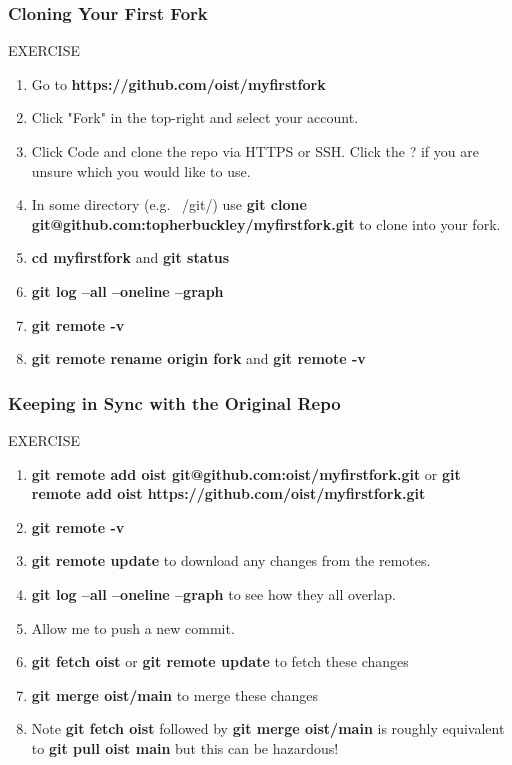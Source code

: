\documentclass{beamer}
\begin{document}
\begin{frame}[fragile]
	\frametitle{Cloning Your First Fork}
	\begin{block}{EXERCISE}
		\begin{enumerate}
			\item Go to \textbf{https://github.com/oist/myfirstfork}
			\item Click "Fork" in the top-right and select your account.
			\item Click Code and clone the repo via HTTPS or SSH. Click the ? if you are unsure which you would like to use. 
			\item In some directory (e.g. ~/git/) use \textbf{git clone git@github.com:topherbuckley/myfirstfork.git} to clone into your fork.
			\item \textbf{cd myfirstfork} and \textbf{git status}
			\item \textbf{git log --all --oneline --graph}
			\item \textbf{git remote -v}
			\item \textbf{git remote rename origin fork} and \textbf{git remote -v}
		\end{enumerate}
	\end{block}
\end{frame}

\begin{frame}[fragile]
	\frametitle{Keeping in Sync with the Original Repo}
	\begin{block}{EXERCISE}
		\begin{enumerate}
			\item \textbf{git remote add oist git@github.com:oist/myfirstfork.git} or \textbf{git remote add oist https://github.com/oist/myfirstfork.git}
			\item \textbf{git remote -v}
			\item \textbf{git remote update} to download any changes from the remotes.
			\item \textbf{git log --all --oneline --graph} to see how they all overlap.
			\item Allow me to push a new commit.
			\item \textbf{git fetch oist} or \textbf{git remote update} to fetch these changes
			\item \textbf{git merge oist/main} to merge these changes
			\item Note \textbf{git fetch oist} followed by \textbf{git merge oist/main} is roughly equivalent to \textbf{git pull oist main} but this can be hazardous!
		\end{enumerate}
	\end{block}
\end{frame}
\end{document}
